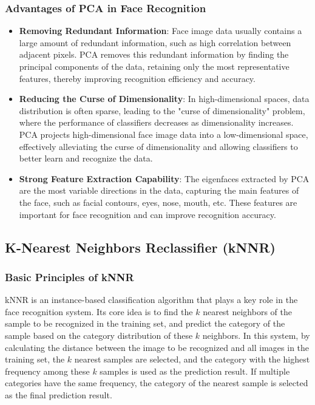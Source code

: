 \documentclass{article}
\begin{document}
\subsubsection{Advantages of PCA in Face Recognition}
\begin{itemize}
    \item \textbf{Removing Redundant Information}: Face image data usually contains a large amount of redundant information, such as high correlation between adjacent pixels. PCA removes this redundant information by finding the principal components of the data, retaining only the most representative features, thereby improving recognition efficiency and accuracy.
    \item \textbf{Reducing the Curse of Dimensionality}: In high-dimensional spaces, data distribution is often sparse, leading to the "curse of dimensionality" problem, where the performance of classifiers decreases as dimensionality increases. PCA projects high-dimensional face image data into a low-dimensional space, effectively alleviating the curse of dimensionality and allowing classifiers to better learn and recognize the data.
    \item \textbf{Strong Feature Extraction Capability}: The eigenfaces extracted by PCA are the most variable directions in the data, capturing the main features of the face, such as facial contours, eyes, nose, mouth, etc. These features are important for face recognition and can improve recognition accuracy.
\end{itemize}

\subsection{K-Nearest Neighbors Reclassifier (kNNR)}

\subsubsection{Basic Principles of kNNR}
kNNR is an instance-based classification algorithm that plays a key role in the face recognition system. Its core idea is to find the \( k \) nearest neighbors of the sample to be recognized in the training set, and predict the category of the sample based on the category distribution of these \( k \) neighbors. In this system, by calculating the distance between the image to be recognized and all images in the training set, the \( k \) nearest samples are selected, and the category with the highest frequency among these \( k \) samples is used as the prediction result. If multiple categories have the same frequency, the category of the nearest sample is selected as the final prediction result.
\end{document}

